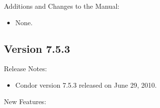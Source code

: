 \noindent Additions and Changes to the Manual:

\begin{itemize}

\item None.

\end{itemize}


\subsection*{\label{sec:New-7-5-3}Version 7.5.3}

\noindent Release Notes:

\begin{itemize}

\item Condor version 7.5.3 released on June 29, 2010.

\end{itemize}


\noindent New Features:

